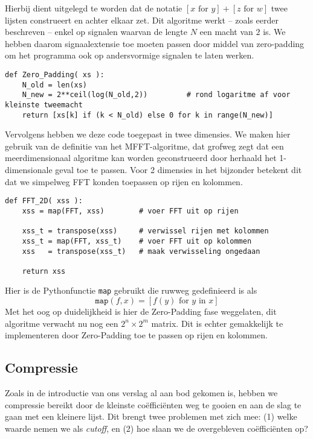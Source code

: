 Hierbij dient uitgelegd te worden dat de notatie $[x \text{ for } y] + [z \text{ for } w]$ twee lijsten construeert en achter elkaar zet. Dit algoritme werkt -- zoals eerder beschreven -- enkel op signalen waarvan de lengte
$N$ een macht van $2$ is. We hebben daarom signaalextensie toe moeten passen door middel van zero-padding
om het programma ook op andersvormige signalen te laten werken.

\begin{lstlisting}[caption={Zero-padding algoritme in Python, voegt nullen toe tot een tweemacht is bereikt}]
def Zero_Padding( xs ):
    N_old = len(xs)
    N_new = 2**ceil(log(N_old,2))         # rond logaritme af voor kleinste tweemacht
    return [xs[k] if (k < N_old) else 0 for k in range(N_new)]
\end{lstlisting}

Vervolgens hebben we deze code toegepast in twee dimensies. We maken hier gebruik van de definitie van het
MFFT-algoritme, dat grofweg zegt dat een meerdimensionaal algoritme kan worden geconstrueerd door herhaald 
het 1-dimensionale geval toe te passen. Voor 2 dimensies in het bijzonder betekent dit dat we simpelweg 
FFT konden toepassen op rijen en kolommen.

\begin{lstlisting}[caption=2-Dimensionaal FFT algoritme]
def FFT_2D( xss ):
    xss = map(FFT, xss)        # voer FFT uit op rijen

    xss_t = transpose(xss)     # verwissel rijen met kolommen
    xss_t = map(FFT, xss_t)    # voer FFT uit op kolommen
    xss   = transpose(xss_t)   # maak verwisseling ongedaan 

    return xss
\end{lstlisting}
Hier is de Pythonfunctie \texttt{map} gebruikt die ruwweg gedefinieerd is als 
\[
	\texttt{map}(f,x) = [f(y) \text{ for } y \text{ in } x]
\]
Met het oog op duidelijkheid is hier de Zero-Padding fase weggelaten, 
dit algoritme verwacht nu nog een $2^n \times 2^m$ matrix.
Dit is echter gemakkelijk te implementeren door Zero-Padding toe te passen op rijen en kolommen.

\subsection{Compressie}
Zoals in de introductie van ons verslag al aan bod gekomen is, hebben we compressie bereikt door de kleinste co\"effici\"enten weg te gooien en aan de slag te gaan met een kleinere lijst. Dit brengt twee problemen met zich mee: (1) welke waarde nemen we als \emph{cutoff}, en (2) hoe slaan we de overgebleven co\"effici\"enten op?
